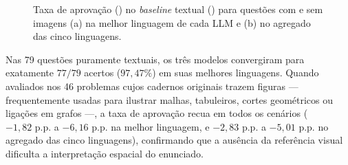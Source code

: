\begin{table}[!htbp]
\centering
\caption{Desempenho no \textit{baseline} (, $T=0$) entre questões com e sem imagens.}
\label{tab:res-pp2-baseline}
\end{table}

\begin{figure}[!htbp]
\centering

\caption[Contraste entre questões com e sem imagens na PP2]{Taxa de aprovação () no \textit{baseline} textual () para questões com e sem imagens (a) na melhor linguagem de cada LLM e (b) no agregado das cinco linguagens.}
\label{fig:res-pp2-img-noimg}
\end{figure}
\FloatBarrier

Nas 79 questões puramente textuais, os três modelos convergiram para exatamente $77/79$ acertos ($97{,}47\%$) em suas melhores linguagens. Quando avaliados nos 46 problemas cujos cadernos originais trazem figuras --- frequentemente usadas para ilustrar malhas, tabuleiros, cortes geométricos ou ligações em grafos ---, a taxa de aprovação recua em todos os cenários ($-1{,}82\text{ p.p.}$ a $-6{,}16\text{ p.p.}$ na melhor linguagem, e $-2{,}83\text{ p.p.}$ a $-5{,}01\text{ p.p.}$ no agregado das cinco linguagens), confirmando que a ausência da referência visual dificulta a interpretação espacial do enunciado.

